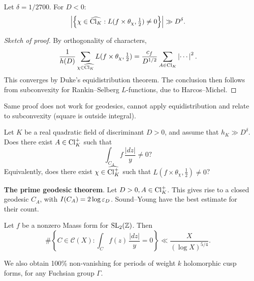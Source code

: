 \documentclass[reqno]{amsart} 
\begin{document}
\begin{theorem}
  Let $\delta = 1/2700$.  For $D < 0$:
  \begin{equation*}
    \left| \left\{ \chi \in \widehat{\operatorname{Cl}_K} : L(f \times \theta_\chi, \tfrac{1}{2}) \neq 0 \right\} \right|
    \gg D^\delta.
  \end{equation*}
\end{theorem}
\begin{proof}[Sketch of proof]
  By orthogonality of characters,
  \begin{equation*}
    \frac{1}{h(D)}
    \sum_{\chi \in \widehat{\operatorname{Cl}_K}}
    L(f \times \theta_\chi, \tfrac{1}{2})
    = \frac{c_f}{ D^{1/2}}
    \sum_{A \in \operatorname{Cl}_K} \left| \dotsb \right|^2.
  \end{equation*}
  This converges by Duke's equidistribution theorem.  The conclusion then follows from subconvexity for Rankin--Selberg $L$-functions, due to Harcos--Michel.
\end{proof}

Same proof does not work for geodesics, cannot apply equidistribution and relate to subconvexity (square is outside integral).  

\begin{question}
  Let $K$ be a real quadratic field of discriminant $D > 0$, and assume that $h_K  \gg D^\delta$.  Does there exist $A \in \operatorname{Cl}_K^+$ such that
  \begin{equation*}
    \int_{C_A} f \, \frac{\lvert d z \rvert}{y} \neq 0?
  \end{equation*}
  Equivalently, does there exist $\chi \in \widehat{\operatorname{Cl}_K^+}$ such that $L(f \times \theta_\chi, \tfrac{1}{2}) \neq 0$?
\end{question}

\textbf{The prime geodesic theorem}.  Let $D > 0, A \in \operatorname{Cl}_K^+$.  This gives rise to a closed geodesic $C_A$, with $I(C_A) = 2 \log \varepsilon_D$.  Sound--Young have the best estimate for their count.

\begin{theorem}[C--Nordentoft 2024]
  Let $f$ be a nonzero Maass form for $\operatorname{SL}_2(\mathbb{Z})$.  Then
  \begin{equation*}
    \# \left\{ C \in \mathcal{C}(X) :
      \int_{C}
      f(z)
      \, \frac{\lvert d z \rvert}{y} =  0\right\}
    \ll
    \frac{X}{(\log X)^{5/4}}.
  \end{equation*}
\end{theorem}

\begin{remark}
  We also obtain 100\% non-vanishing for periods of weight $k$ holomorphic cusp forms, for any Fuchsian group $\Gamma$.
\end{remark}
\end{document}
